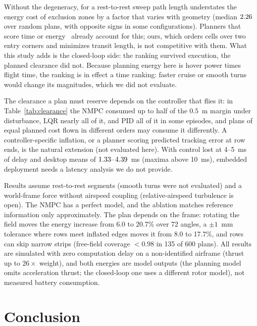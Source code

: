 \documentclass[\PAPERCLASSOPT]{IEEEtran}
\begin{document}
Without the degeneracy, for a rest-to-rest sweep path length understates the energy cost of exclusion zones by a factor that varies
with geometry (median $2.26$ over random plans, with opposite signs in
some configurations). Planners that score time or energy~\cite{difranco2015energy,datsko2024energy,bahnemann2019gtsp}
already account for this; ours, which orders cells over two entry corners and
minimizes transit length, is not competitive with them. What this study adds is
the closed-loop side: the ranking survived execution, the planned clearance did not. Because planning energy here is hover power times
flight time, the ranking is in effect a time ranking: faster cruise or smooth
turns would change its magnitudes, which we did not evaluate.

The clearance a plan must reserve depends on the controller that flies it: in Table~\ref{tab:clearance} the
NMPC consumed up to half of the $0.5$~m margin under disturbance, LQR nearly all of it, and PID
all of it in some episodes, and plans of equal planned cost flown in different
orders may consume it differently. A controller-specific inflation, or a planner scoring predicted tracking
error at row ends, is the natural extension (not evaluated here). With control lost at 4--5~ms of delay and desktop means of
$1.33$--$4.39$~ms (maxima above 10~ms), embedded deployment
needs a latency analysis we do not provide.

Results assume rest-to-rest segments (smooth
turns were not evaluated) and a world-frame force without airspeed coupling
(relative-airspeed turbulence is open). The NMPC has a
perfect model, and the ablation matches reference information only
approximately. The plan depends on the frame: rotating the field moves the
energy increase from 6.0 to 20.7\% over 72 angles, a $\pm1$~mm tolerance where
rows meet inflated edges moves it from 8.0 to 17.7\%, and rows can skip narrow
strips (free-field coverage $<0.98$ in 135 of 600 plans). All results are
simulated with zero computation delay on a non-identified airframe (thrust up
to $26\times$ weight), and both energies are model outputs (the planning model
omits acceleration thrust; the closed-loop one uses a different rotor model),
not measured battery consumption.

\section{Conclusion}
\end{document}
